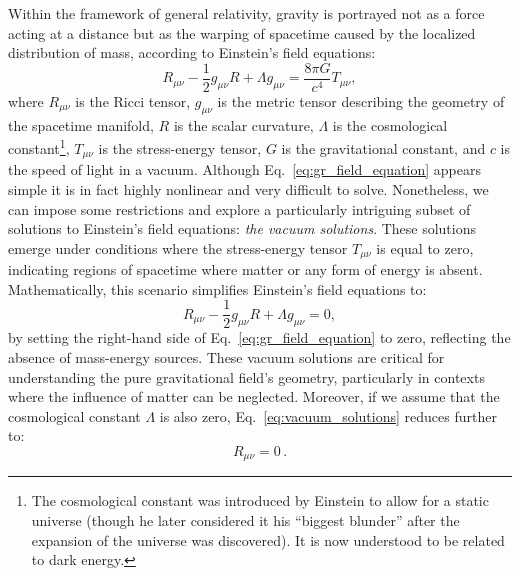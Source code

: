 \documentclass[main.tex]{subfiles}
\begin{document}
    Within the framework of general relativity, gravity is portrayed not as a force acting at a distance but as the warping of spacetime caused by the localized distribution of mass, according to Einstein's field equations:
    \begin{equation}\label{eq:gr_field_equation}
        R_{\mu \nu} - \frac{1}{2}g_{\mu \nu}R + \Lambda g_{\mu \nu} = \frac{8\pi G}{c^4} T_{\mu \nu}, 
    \end{equation}
    where $R_{\mu \nu}$ is the Ricci tensor, $g_{\mu \nu}$ is the metric tensor describing the geometry of the spacetime manifold, $R$ is the scalar curvature, $\Lambda$ is the cosmological constant\footnote{The cosmological constant was introduced by Einstein to allow for a static universe (though he later considered it his ``biggest blunder'' after the expansion of the universe was discovered). It is now understood to be related to dark energy.}, $T_{\mu \nu}$ is the stress-energy tensor, $G$ is the gravitational constant, and $c$ is the speed of light in a vacuum. Although Eq.~\eqref{eq:gr_field_equation} appears simple it is in fact highly nonlinear and very difficult to solve. Nonetheless, we can impose some restrictions and explore a particularly intriguing subset of solutions to Einstein's field equations: \textit{the vacuum solutions}. These solutions emerge under conditions where the stress-energy tensor $T_{\mu \nu}$ is equal to zero, indicating regions of spacetime where matter or any form of energy is absent. Mathematically, this scenario simplifies Einstein's field equations to:
    \begin{equation}\label{eq:vacuum_solutions}
    R_{\mu \nu} - \frac{1}{2}g_{\mu \nu}R + \Lambda g_{\mu \nu} = 0,
    \end{equation}
    by setting the right-hand side of Eq.~\eqref{eq:gr_field_equation} to zero, reflecting the absence of mass-energy sources. These vacuum solutions are critical for understanding the pure gravitational field's geometry, particularly in contexts where the influence of matter can be neglected. Moreover, if we assume that the cosmological constant $\Lambda$ is also zero, Eq.~\eqref{eq:vacuum_solutions} reduces further to:
    \begin{equation}\label{eq:vanishing_ricci}
        R_{\mu \nu} = 0\,.
    \end{equation}
    
\end{document}
